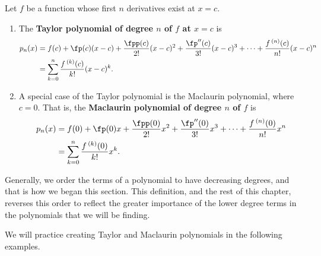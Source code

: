 {
\begin{definition}\label{def:taypoly}
Let $f$ be a function whose first $n$ derivatives exist at $x=c$.
 
\begin{enumerate}
	\item	The \textbf{Taylor polynomial of degree $n$ of $f$ at $x=c$} is 
	\begin{align*}
	p_n(x)
	&= f(c) + \fp(c)(x-c) + \frac{\fpp(c)}{2!}(x-c)^2+\frac{\fp''(c)}{3!}(x-c)^3+\dotsb+\frac{f\,^{(n)}(c)}{n!}(x-c)^n \\
	&=\sum_{k=0}^n\frac{f\,^{(k)}(c)}{k!}(x-c)^k.
	\end{align*}
	\item	A special case of the Taylor polynomial is the Maclaurin polynomial, where $c=0$. That is, the \textbf{Maclaurin polynomial of degree $n$ of $f$} is 
	\begin{align*}
	p_n(x)
	&= f(0) + \fp(0)x + \frac{\fpp(0)}{2!}x^2+\frac{\fp''(0)}{3!}x^3+\dotsb+\frac{f\,^{(n)}(0)}{n!}x^n \\
	&=\sum_{k=0}^n\frac{f\,^{(k)}(0)}{k!}x^k.
	\end{align*}
\end{enumerate}
\end{definition}
}

Generally, we order the terms of a polynomial to have decreasing degrees, and that is how we began this section.  This definition, and the rest of this chapter, reverses this order to reflect the greater importance of the lower degree terms in the polynomials that we will be finding.


We will practice creating Taylor and Maclaurin polynomials in the following examples.

